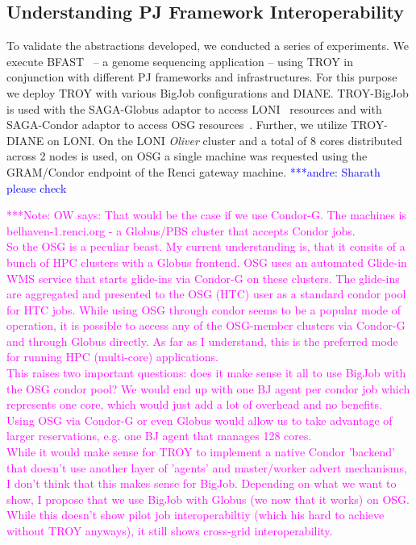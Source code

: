 \documentclass[conference,final]{IEEEtran}
\newcommand{\alnote}[1]{ {\textcolor{blue} { ***andre: #1 }}}
\newcommand{\note}[1]{ {\textcolor{magenta} { ***Note: #1 }}}
\newcommand{\alnote}[1]{}
\newcommand{\note}[1]{}
\newcommand{\upp}{\vspace*{-0.5em}}
\begin{document}
\subsection{Understanding PJ Framework Interoperability\upp\upp}

To validate the abstractions developed, we conducted a series of
experiments. We execute BFAST~\cite{bfast2009} -- a genome sequencing
application -- using TROY in conjunction with different PJ frameworks
and infrastructures. For this purpose we deploy TROY with various
BigJob configurations and DIANE. TROY-BigJob is used with the
SAGA-Globus adaptor to access LONI~\cite{loni} resources and with
SAGA-Condor adaptor to access OSG
resources~\cite{1742-6596-78-1-012057}.  Further, we utilize
TROY-DIANE on LONI. On the LONI \textit{Oliver} cluster and a total of 8 cores
distributed across 2 nodes is used, on OSG a single machine was
requested using the GRAM/Condor endpoint of the Renci gateway machine.
\alnote{Sharath please check}

\note{OW says: That would be the case if we use Condor-G. The machines
is belhaven-1.renci.org - a Globus/PBS cluster that accepts Condor jobs.\\
So the OSG is a peculiar beast. My current understanding is, that it consits 
of a bunch of HPC clusters with a Globus frontend. OSG uses an automated 
Glide-in WMS service that starts glide-ins via Condor-G on these clusters.
The glide-ins are aggregated and presented to the OSG (HTC) user as a 
standard condor pool for HTC jobs. While using OSG through condor seems 
to be a popular mode of operation, it is possible to access any of the 
OSG-member clusters via Condor-G and through Globus directly. As far as I
understand, this is the preferred mode for running HPC (multi-core) 
applications.\\
This raises two important questions: does it make sense it all to use
BigJob with the OSG condor pool? We would end up with one BJ agent per
condor job which represents one core, which would just add a lot of overhead and
no benefits. Using OSG via Condor-G or even Globus would allow us to
take advantage of larger reservations, e.g. one BJ agent that manages
128 cores.\\
While it would make sense for TROY to implement a native Condor 'backend'
that doesn't use another layer of 'agents' and master/worker advert 
mechanisms, I don't think that this makes sense for BigJob. Depending on 
what we want to show, I propose that we use BigJob with Globus (we now that 
it works) on OSG. While this doesn't show pilot job interoperabiltiy
(which his hard to achieve without TROY anyways), it still shows cross-grid
interoperability.}
\end{document}
